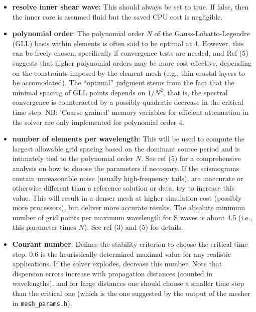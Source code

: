 \documentclass[11pt,letter,fleqn,english,notitlepage]{article}
\begin{document}
\begin{itemize}
    \item \textbf{resolve inner shear wave:} This should always be set to true.
    If false, then the inner core is assumed fluid but the saved CPU cost is negligible.
    
    \item \textbf{polynomial order}: The polynomial order $N$ of the
    Gauss-Lobatto-Legendre (GLL) basis within elements is often said to be
    optimal at 4. However, this can be freely chosen, specifically if
    convergence tests are needed, and Ref (5) suggests that higher polynomial
    orders may be more cost-effective, depending on the constraints imposed by
    the element mesh (e.g., thin crustal layers to be accomodated). The
    ``optimal'' judgment stems from the fact that the minimal spacing of GLL
    points depends on $1/N^2$, that is, the spectral convergence is
    counteracted by a possibly quadratic decrease in the critical time step.
    NB: 'Coarse grained' memory variables for efficient attenuation in the solver
    are only implemented for polynomial order 4.
    
    \item \textbf{number of elements per wavelength}: This will be used to
    compute the largest allowable grid spacing based on the dominant source
    period and is intimately tied to the polynomial order $N$. See ref (5) for
    a comprehensive analysis on how to choose the parameters if necessary.  If
    the seismograms contain unreasonable noise (usually high-frequency tails),
    are inaccurate or otherwise different than a reference solution or data,
    try to increase this value. This will result in a denser mesh at higher
    simulation cost (possibly more processors), but deliver more accurate
    results. The absolute minimum number of grid points per maximum wavelength
    for S waves is about 4.5 (i.e., this parameter times $N$). See ref (3) and
    (5) for details.
    
    \item \textbf{Courant number}: Defines the stability criterion to choose
    the critical time step.  0.6 is the heuristically determined maximal value
    for any realistic applications. If the solver explodes, decrease this
    number. Note that dispersion errors increase with propagation distances
    (counted in wavelengths), and for large distances one should  choose a
    smaller time step than the critical one (which is the one suggested by the
    output of the mesher in {\tt mesh\_params.h}).
    

\end{itemize}
\end{document}
